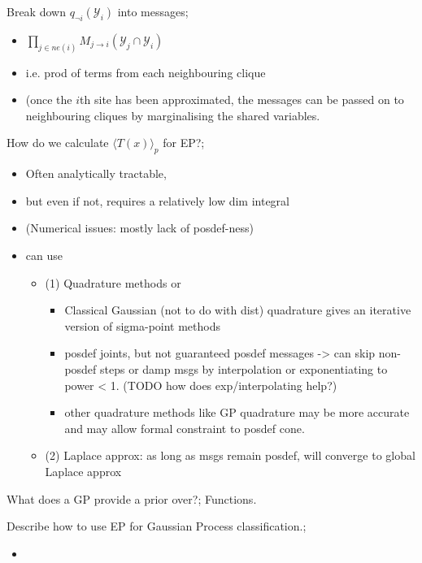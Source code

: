 \documentclass{article}
\begin{document}
Break down $q_{\neg i}(\mathcal{Y}_i)$ into messages; \begin{itemize}
    \item $\prod_{j\in ne(i)}M_{j\rightarrow i}(\mathcal{Y}_j \cap \mathcal{Y}_i)$
    \item i.e. prod of terms from each neighbouring clique
    \item (once the $i$th site has been approximated, the messages can be passed on to neighbouring cliques by marginalising the shared variables.
\end{itemize}




How do we calculate $\langle T(x) \rangle_p$ for EP?; \begin{itemize}
    \item Often analytically tractable, 
    \item but even if not, requires a relatively low dim integral 
    \item (Numerical issues: mostly lack of posdef-ness)
    \item can use \begin{itemize}
        \item (1) Quadrature methods or 
        \begin{itemize}
            \item Classical Gaussian (not to do with dist) quadrature gives an iterative version of sigma-point methods
            \item posdef joints, but not guaranteed posdef messages -> can skip non-posdef steps or damp msgs by interpolation or exponentiating to power < 1. (TODO how does exp/interpolating help?)
            \item other quadrature methods like GP quadrature may be more accurate and  may allow formal constraint to posdef cone.
        \end{itemize}
        \item (2) Laplace approx: as long as msgs remain posdef, will converge to global Laplace approx
    \end{itemize}
\end{itemize}

What does a GP provide a prior over?; Functions.

Describe how to use EP for Gaussian Process classification.; \begin{itemize}
    \item 
\end{itemize}
\end{document}
